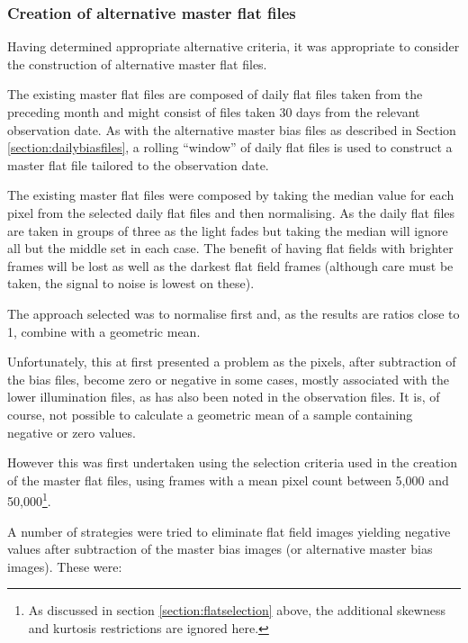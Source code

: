 \subsubsection{Creation of alternative master flat files}
\protect\label{seciion:altmasters}

Having determined appropriate alternative criteria, it was appropriate to
consider the construction of alternative master flat files.

The existing master flat files are composed of daily flat files taken from the
preceding month and might consist of files taken 30 days from the relevant
observation date. As with the alternative master bias files as described in
Section \ref{section:dailybiasfiles}, a rolling ``window'' of daily flat files
is used to construct a master flat file tailored to the observation date. 

The existing master flat files were composed by taking the median value for each
pixel from the selected daily flat files and then normalising. As the daily flat
files are taken in groups of three as the light fades but taking the median will
ignore all but the middle set in each case. The benefit of having flat fields
with brighter frames will be lost as well as the darkest flat field frames
(although care must be taken, the signal to noise is lowest on these).

The approach selected was to normalise first and, as the results are ratios
close to 1, combine with a geometric mean.

Unfortunately, this at first presented a problem as the pixels, after
subtraction of the bias files, become zero or negative in some cases, mostly
associated with the lower illumination files, as has also been noted in the
observation files. It is, of course, not possible to calculate a geometric mean
of a sample containing negative or zero values.

However this was first undertaken using the selection criteria used in the
creation of the master flat files, using frames with a mean pixel count between
5,000 and 50,000\footnote{As discussed in section \ref{section:flatselection}
above, the additional skewness and kurtosis restrictions are ignored here.}.

A number of strategies were tried to eliminate flat field images yielding
negative values after subtraction of the master bias images (or alternative
master bias images). These were:


